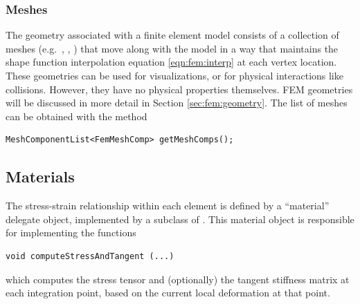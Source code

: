 \subsubsection{Meshes}
\ifLaTeXML{\newline}

The geometry associated with a finite element model consists of a collection
of meshes (e.g.~, ,
) that move along with the
model in a way that maintains the shape function interpolation equation 
\eqref{eqn:fem:interp}
at each vertex location.  These geometries can be used for visualizations, or 
for physical interactions like collisions.  However, they have no physical 
properties themselves. FEM geometries will be discussed in more detail in 
Section \ref{sec:fem:geometry}.  The list of meshes can be obtained with the 
method
\begin{lstlisting}[]
  MeshComponentList<FemMeshComp> getMeshComps();
\end{lstlisting}

\subsection{Materials}
\label{sec:fem:materials}

The stress-strain relationship within each element is defined by a ``material''
delegate object, implemented by a subclass of 
.  This material object is 
responsible for implementing the functions
%
\begin{lstlisting}[]
   void computeStressAndTangent (...)
\end{lstlisting}
%
which computes the stress tensor and (optionally) the tangent stiffness
matrix at each integration point, based on the current local
deformation at that point.

